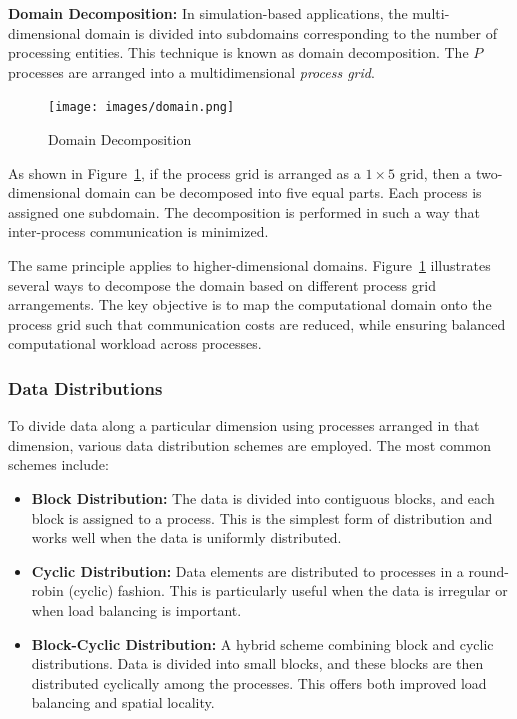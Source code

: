 \documentclass[12pt]{book}
\begin{document}
\textbf{Domain Decomposition:} In simulation-based applications, the multi-dimensional domain is divided into subdomains corresponding to the number of processing entities. This technique is known as domain decomposition. The $P$ processes are arranged into a multidimensional \emph{process grid}.

\begin{figure}[H]
    \centering
    \texttt{[image: images/domain.png]}
    \caption{Domain Decomposition}
    \label{fig:domain}
\end{figure}

As shown in Figure~\ref{fig:domain}, if the process grid is arranged as a $1 \times 5$ grid, then a two-dimensional domain can be decomposed into five equal parts. Each process is assigned one subdomain. The decomposition is performed in such a way that inter-process communication is minimized.

The same principle applies to higher-dimensional domains. Figure~\ref{fig:domain} illustrates several ways to decompose the domain based on different process grid arrangements. The key objective is to map the computational domain onto the process grid such that communication costs are reduced, while ensuring balanced computational workload across processes.


\subsubsection{Data Distributions}

To divide data along a particular dimension using processes arranged in that dimension, various data distribution schemes are employed. The most common schemes include:

\begin{itemize}
    \item \textbf{Block Distribution:} The data is divided into contiguous blocks, and each block is assigned to a process. This is the simplest form of distribution and works well when the data is uniformly distributed.
    
    \item \textbf{Cyclic Distribution:} Data elements are distributed to processes in a round-robin (cyclic) fashion. This is particularly useful when the data is irregular or when load balancing is important.
    
    \item \textbf{Block-Cyclic Distribution:} A hybrid scheme combining block and cyclic distributions. Data is divided into small blocks, and these blocks are then distributed cyclically among the processes. This offers both improved load balancing and spatial locality.
\end{itemize}
\end{document}
